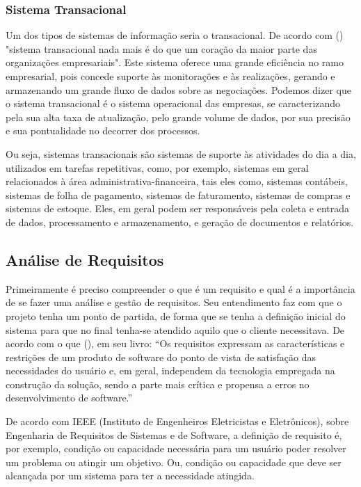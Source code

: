 \subsubsection{Sistema Transacional}

Um dos tipos de sistemas de informação seria o transacional. De acordo com (\cite{transacionais}) "sistema transacional nada mais é do que um coração da maior parte das organizações empresariais". Este sistema oferece uma grande eficiência no ramo empresarial, pois concede suporte às monitorações e às realizações, gerando e armazenando um grande fluxo de dados sobre as negociações. Podemos dizer que o sistema transacional é o sistema operacional das empresas, se caracterizando pela sua alta taxa de atualização, pelo grande volume de dados, por sua precisão e sua pontualidade no decorrer dos processos.

Ou seja, sistemas transacionais são sistemas de suporte às atividades do dia a dia, utilizados em tarefas repetitivas, como, por exemplo, sistemas em geral relacionados à área administrativa-financeira, tais eles como, sistemas contábeis, sistemas de folha de pagamento, sistemas de faturamento, sistemas de compras e sistemas de estoque. Eles, em geral podem ser responsáveis pela coleta e entrada de dados, processamento e armazenamento, e geração de documentos e relatórios.
\subsection{Análise de Requisitos}

Primeiramente é preciso compreender o que é um requisito e qual é a importância de se fazer uma análise e gestão de requisitos. Seu entendimento faz com que o projeto tenha um ponto de partida, de forma que se tenha a definição inicial do sistema para que no final tenha-se atendido aquilo que o cliente necessitava. De acordo com o que (\cite{machado-2011}), em seu livro: “Os requisitos expressam as características e restrições de um produto de software do ponto de vista de satisfação das necessidades do usuário e, em geral, independem da tecnologia empregada na construção da solução, sendo a parte mais crítica e propensa a erros no desenvolvimento de software.” 

De acordo com IEEE (Instituto de Engenheiros Eletricistas e Eletrônicos), sobre Engenharia de Requisitos de Sistemas e de Software, a definição de requisito é, por exemplo, condição ou capacidade necessária para um usuário poder resolver um problema ou atingir um objetivo. Ou, condição ou capacidade que deve ser alcançada por um sistema para ter a necessidade atingida.

